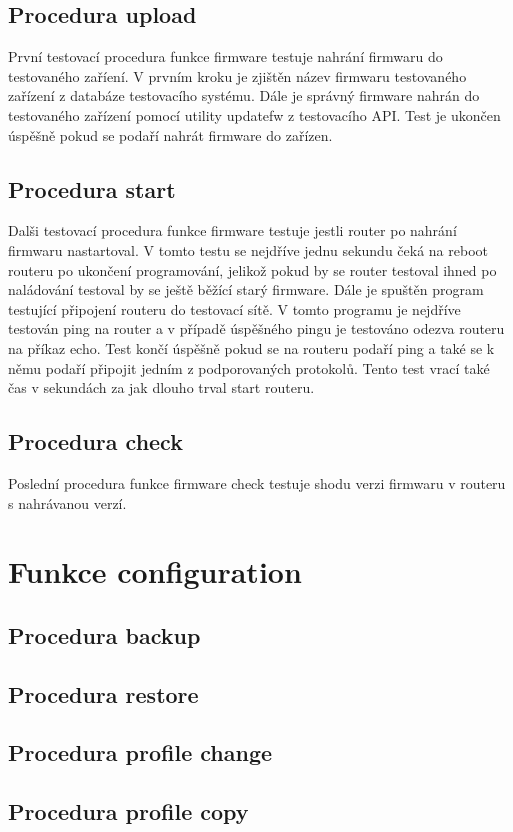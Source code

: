 \subsection{Procedura upload}
První testovací procedura funkce firmware testuje nahrání firmwaru do testovaného zaříení. V prvním kroku je zjištěn název firmwaru testovaného zařízení z databáze testovacího systému. Dále je správný firmware nahrán do testovaného zařízení pomocí utility updatefw z testovacího API. Test je ukončen úspěšně pokud se podaří nahrát firmware do zařízen.

\subsection{Procedura start}
Dalši testovací procedura funkce firmware testuje jestli router po nahrání firmwaru nastartoval. V tomto testu se nejdříve jednu sekundu čeká na reboot routeru po ukončení programování, jelikož pokud by se router testoval ihned po naládování testoval by se ještě běžící starý firmware. Dále je spuštěn program testující připojení routeru do testovací sítě. V tomto programu je nejdříve testován ping na router a v případě úspěšného pingu je testováno odezva routeru na příkaz echo. Test končí úspěšně pokud se na routeru podaří ping a také se k němu podaří připojit jedním z podporovaných protokolů. Tento test vrací také čas v sekundách za jak dlouho trval start routeru.

\subsection{Procedura check}
Poslední procedura funkce firmware check testuje shodu verzi firmwaru v routeru s nahrávanou verzí.

\section{Funkce configuration}
\subsection{Procedura backup}
\subsection{Procedura restore}
\subsection{Procedura profile change}
\subsection{Procedura profile copy}

